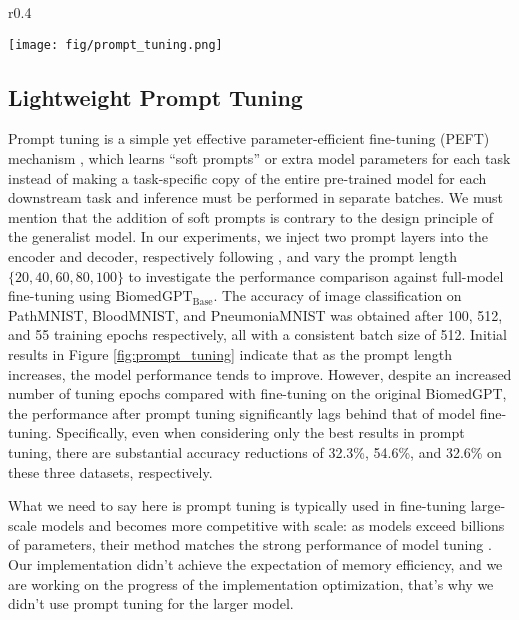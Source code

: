 \documentclass[10pt]{article} \usepackage[preprint]{tmlr}
\begin{document}
\begin{wrapfigure}{r}{0.4\textwidth}
  \begin{center}
    \texttt{[image: fig/prompt\_tuning.png]}
  \end{center}
  \caption{The image classification accuracy with BiomedGPT via prompt tuning. The x-axis represents the prompt length, and the y-axis is the prediction accuracy.} 
  \label{fig:prompt_tuning}
\end{wrapfigure}

\subsection{Lightweight Prompt Tuning} \label{sec:prompt_tuning}
Prompt tuning \citep{lester2021power} is a simple yet effective parameter-efficient fine-tuning (PEFT) mechanism \citep{chen2023parameterefficient}, which learns ``soft prompts'' or extra model parameters for each task instead of making a task-specific copy of the entire pre-trained model for each downstream task and inference must be performed in separate batches. We must mention that the addition of soft prompts is contrary to the design principle of the generalist model. In our experiments, we inject two prompt layers into the encoder and decoder, respectively following \citep{yang2022prompt}, and vary the prompt length $\{20, 40, 60, 80, 100\}$ to investigate the performance comparison against full-model fine-tuning using $\text{BiomedGPT}_{\text{Base}}$.  
The accuracy of image classification on PathMNIST, BloodMNIST, and PneumoniaMNIST was obtained after 100, 512, and 55 training epochs respectively, all with a consistent batch size of 512. Initial results in Figure \ref{fig:prompt_tuning} indicate that as the prompt length increases, the model performance tends to improve. However, despite an increased number of tuning epochs compared with fine-tuning on the original BiomedGPT, the performance after prompt tuning significantly lags behind that of model fine-tuning. Specifically, even when considering only the best results in prompt tuning, there are substantial accuracy reductions of 32.3\%, 54.6\%, and 32.6\% on these three datasets, respectively.

What we need to say here is prompt tuning is typically used in fine-tuning large-scale models and becomes more competitive with scale: as models exceed billions of parameters, their method matches the strong performance of model tuning \citep{lester2021power}. Our implementation didn't achieve the expectation of memory efficiency, and we are working on the progress of the implementation optimization, that's why we didn't use prompt tuning for the larger model.
\end{document}
